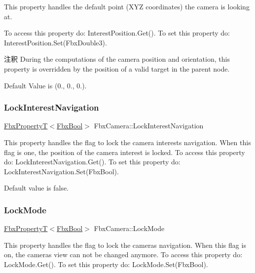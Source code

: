 This property handles the default point (X\+YZ coordinates) the camera is looking at.

To access this property do\+: Interest\+Position.\+Get(). To set this property do\+: Interest\+Position.\+Set(\+Fbx\+Double3).

\begin{DoxyRemark}{注釈}
During the computations of the camera position and orientation, this property is overridden by the position of a valid target in the parent node.

Default Value is (0., 0., 0.). 
\end{DoxyRemark}
\mbox{\label{class_fbx_camera_a3060679e7b5d5c6ba05fd78f5bfee955}} 
\subsubsection{\texorpdfstring{Lock\+Interest\+Navigation}{LockInterestNavigation}}
{\footnotesize\ttfamily \hyperlink{class_fbx_property_t}{Fbx\+PropertyT}$<$\hyperlink{fbxtypes_8h_a92e0562b2fe33e76a242f498b362262e}{Fbx\+Bool}$>$ Fbx\+Camera\+::\+Lock\+Interest\+Navigation}

This property handles the flag to lock the camera interest\textquotesingle{}s navigation. When this flag is one, the position of the camera interest is locked. To access this property do\+: Lock\+Interest\+Navigation.\+Get(). To set this property do\+: Lock\+Interest\+Navigation.\+Set(\+Fbx\+Bool).

Default value is false. \mbox{\label{class_fbx_camera_aba8fcdabc543461794dcfbd683af1e76}} 
\subsubsection{\texorpdfstring{Lock\+Mode}{LockMode}}
{\footnotesize\ttfamily \hyperlink{class_fbx_property_t}{Fbx\+PropertyT}$<$\hyperlink{fbxtypes_8h_a92e0562b2fe33e76a242f498b362262e}{Fbx\+Bool}$>$ Fbx\+Camera\+::\+Lock\+Mode}

This property handles the flag to lock the camera\textquotesingle{}s navigation. When this flag is on, the camera\textquotesingle{}s view can not be changed anymore. To access this property do\+: Lock\+Mode.\+Get(). To set this property do\+: Lock\+Mode.\+Set(\+Fbx\+Bool).

